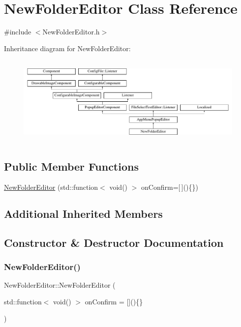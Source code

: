 \hypertarget{classNewFolderEditor}{}\section{New\+Folder\+Editor Class Reference}
\label{classNewFolderEditor}


{\ttfamily \#include $<$New\+Folder\+Editor.\+h$>$}

Inheritance diagram for New\+Folder\+Editor\+:\begin{figure}[H]
\begin{center}
\leavevmode
\includegraphics[height=4.444445cm]{classNewFolderEditor}
\end{center}
\end{figure}
\subsection*{Public Member Functions}
\begin{DoxyCompactItemize}
\item 
\mbox{\hyperlink{classNewFolderEditor_ab5cf0e607c6dc43e021bc2a7207233ef}{New\+Folder\+Editor}} (std\+::function$<$ void() $>$ on\+Confirm=\mbox{[}$\,$\mbox{]}()\{\})
\end{DoxyCompactItemize}
\subsection*{Additional Inherited Members}


\subsection{Constructor \& Destructor Documentation}
\mbox{\label{classNewFolderEditor_ab5cf0e607c6dc43e021bc2a7207233ef}} 
\subsubsection{\texorpdfstring{New\+Folder\+Editor()}{NewFolderEditor()}}
{\footnotesize\ttfamily New\+Folder\+Editor\+::\+New\+Folder\+Editor (\begin{DoxyParamCaption}\item[{std\+::function$<$ void() $>$}]{on\+Confirm = {\ttfamily \mbox{[}\mbox{]}()\{\}} }\end{DoxyParamCaption})}

